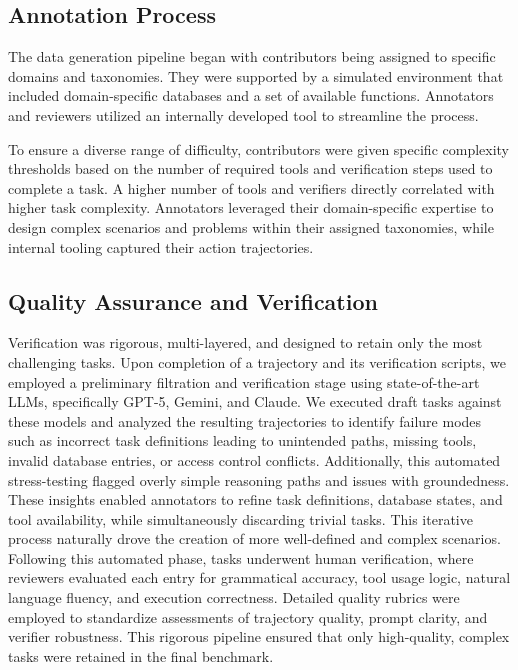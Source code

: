 \subsection{Annotation Process}
\label{app:annot_process}
The data generation pipeline began with contributors being assigned to specific domains and taxonomies. They were supported by a simulated environment that included domain-specific databases and a set of available functions. Annotators and reviewers utilized an internally developed tool to streamline the process.

To ensure a diverse range of difficulty, contributors were given specific complexity thresholds based on the number of required tools and verification steps used to complete a task. A higher number of tools and verifiers directly correlated with higher task complexity. Annotators leveraged their domain-specific expertise to design complex scenarios and problems within their assigned taxonomies, while internal tooling captured their action trajectories.

\subsection{Quality Assurance and Verification}
\label{app:annot_qa}
Verification was rigorous, multi-layered, and designed to retain only the most challenging tasks. Upon completion of a trajectory and its verification scripts, we employed a preliminary filtration and verification stage using state-of-the-art LLMs, specifically GPT-5, Gemini, and Claude. We executed draft tasks against these models and analyzed the resulting trajectories to identify failure modes such as incorrect task definitions leading to unintended paths, missing tools, invalid database entries, or access control conflicts. Additionally, this automated stress-testing flagged overly simple reasoning paths and issues with groundedness. These insights enabled annotators to refine task definitions, database states, and tool availability, while simultaneously discarding trivial tasks. This iterative process naturally drove the creation of more well-defined and complex scenarios. Following this automated phase, tasks underwent human verification, where reviewers evaluated each entry for grammatical accuracy, tool usage logic, natural language fluency, and execution correctness. Detailed quality rubrics were employed to standardize assessments of trajectory quality, prompt clarity, and verifier robustness. This rigorous pipeline ensured that only high-quality, complex tasks were retained in the final benchmark.

